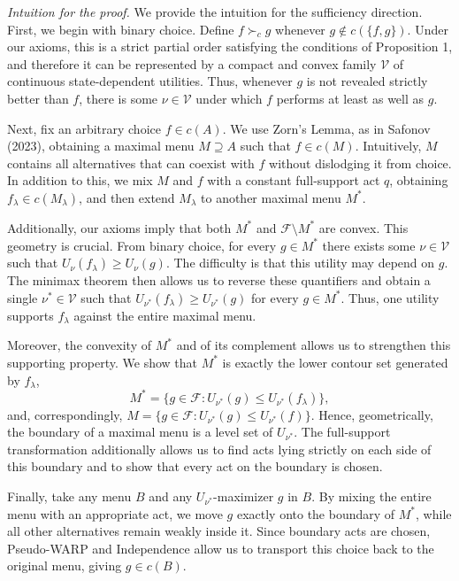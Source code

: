 \documentclass[11pt]{article}
\begin{document}
\textit{Intuition for the proof.} We provide the intuition for the sufficiency direction. First, we begin with binary choice. Define $f\succ_c g$ whenever $g\notin c(\{f,g\})$. Under our axioms, this is a strict partial order satisfying the conditions of Proposition 1, and therefore it can be represented by a compact and convex family $\mathcal V$ of continuous state-dependent utilities. Thus, whenever $g$ is not revealed strictly better than $f$, there is some $\nu\in\mathcal V$ under which $f$ performs at least as well as $g$.

Next, fix an arbitrary choice $f\in c(A)$. We use Zorn's Lemma, as in Safonov (2023), obtaining a maximal menu $M\supseteq A$ such that $f\in c(M)$. Intuitively, $M$ contains all alternatives that can coexist with $f$ without dislodging it from choice. In addition to this, we mix $M$ and $f$ with a constant full-support act $q$, obtaining $f_\lambda\in c(M_\lambda)$, and then extend $M_\lambda$ to another maximal menu $M^*$.

Additionally, our axioms imply that both $M^*$ and $\mathcal F\setminus M^*$ are convex. This geometry is crucial. From binary choice, for every $g\in M^*$ there exists some $\nu\in\mathcal V$ such that $U_\nu(f_\lambda)\geq U_\nu(g)$. The difficulty is that this utility may depend on $g$. The minimax theorem then allows us to reverse these quantifiers and obtain a single $\nu^*\in\mathcal V$ such that $U_{\nu^*}(f_\lambda)\geq U_{\nu^*}(g)$ for every $g\in M^*$. Thus, one utility supports $f_\lambda$ against the entire maximal menu.

Moreover, the convexity of $M^*$ and of its complement allows us to strengthen this supporting property. We show that $M^*$ is exactly the lower contour set generated by $f_\lambda$,
\[
 M^*=\{g\in\mathcal F:U_{\nu^*}(g)\leq U_{\nu^*}(f_\lambda)\},
\]
and, correspondingly, $M=\{g\in\mathcal F:U_{\nu^*}(g)\leq U_{\nu^*}(f)\}$. Hence, geometrically, the boundary of a maximal menu is a level set of $U_{\nu^*}$. The full-support transformation additionally allows us to find acts lying strictly on each side of this boundary and to show that every act on the boundary is chosen.

Finally, take any menu $B$ and any $U_{\nu^*}$-maximizer $g$ in $B$. By mixing the entire menu with an appropriate act, we move $g$ exactly onto the boundary of $M^*$, while all other alternatives remain weakly inside it. Since boundary acts are chosen, Pseudo-WARP and Independence allow us to transport this choice back to the original menu, giving $g\in c(B)$.
\end{document}
